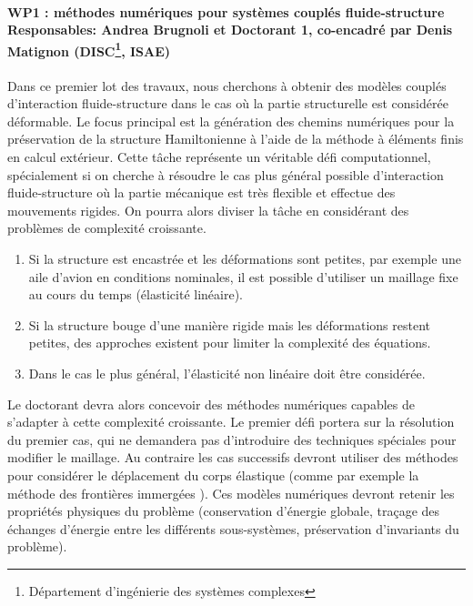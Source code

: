 \documentclass[12pt, french]{article}
\begin{document}
	
	\paragraph[\large WP1 : méthodes numériques pour systèmes couplés fluide-structure\\
	Responsables: Andrea Brugnoli et Doctorant 1, co-encadré par Denis Matignon (DISC, ISAE)]{\large WP1 : méthodes numériques pour systèmes couplés fluide-structure\\
		Responsables: Andrea Brugnoli et Doctorant 1, co-encadré par Denis Matignon (DISC\footnote{Département d’ingénierie des systèmes complexes}, ISAE)\\}
	
	Dans ce premier lot des travaux, nous cherchons à obtenir des modèles couplés d'interaction fluide-structure dans le cas où la partie structurelle est considérée déformable. Le focus principal est la génération des chemins numériques pour la préservation de la structure Hamiltonienne à l'aide de la méthode à éléments finis en calcul extérieur. Cette t\^ache représente un véritable défi computationnel, spécialement si on cherche à résoudre le cas plus général possible d'interaction fluide-structure où la partie mécanique est très flexible et effectue des mouvements rigides. On pourra alors diviser la t\^{a}che en considérant des problèmes de complexité croissante. 
	\begin{enumerate}
		\item Si la structure est encastrée et les déformations sont petites, par exemple une aile d'avion en conditions nominales, il est possible d'utiliser un maillage fixe au cours du temps (élasticité linéaire). 
		\item Si la structure bouge d'une manière rigide mais les déformations restent petites, des approches existent pour limiter la complexité des équations.
		\item Dans le cas le plus général, l'élasticité non linéaire doit être considérée.
	\end{enumerate}
	Le doctorant devra alors concevoir des méthodes numériques capables de s'adapter à cette complexité croissante. Le premier défi portera sur la résolution du premier cas, qui ne demandera pas d'introduire des techniques spéciales pour modifier le maillage. Au contraire les cas successifs devront utiliser des méthodes pour considérer le déplacement du corps élastique (comme par exemple la méthode des frontières immergées \cite{peskin2002}). Ces modèles numériques devront retenir les propriétés physiques du problème (conservation d'énergie globale, traçage des échanges d'énergie entre les différents sous-systèmes, préservation d'invariants du problème).
	
\end{document}
